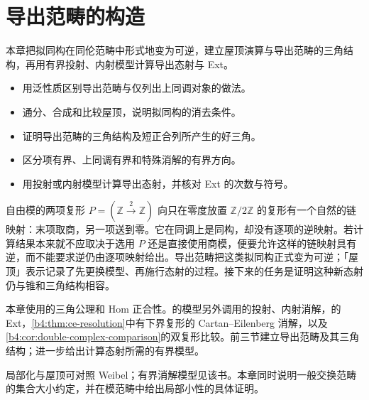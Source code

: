 
\chapter{导出范畴的构造}
\label{b4:ch:17}

\begin{chapterabstract}
	本章把拟同构在同伦范畴中形式地变为可逆，建立屋顶演算与导出范畴的三角结构，再用有界投射、内射模型计算导出态射与 Ext。
\end{chapterabstract}

\begin{learninggoals}
	\begin{itemize}
		\item 用泛性质区别导出范畴与仅列出上同调对象的做法。
		\item 通分、合成和比较屋顶，说明拟同构的消去条件。
		\item 证明导出范畴的三角结构及短正合列所产生的好三角。
		\item 区分项有界、上同调有界和特殊消解的有界方向。
		\item 用投射或内射模型计算导出态射，并核对 Ext 的次数与符号。
	\end{itemize}
\end{learninggoals}

自由模的两项复形 \(P=(\mathbb Z\xrightarrow{2}\mathbb Z)\) 向只在零度放置 \(\mathbb Z/2\mathbb Z\) 的复形有一个自然的链映射：末项取商，另一项送到零。它在同调上是同构，却没有逐项的逆映射。若计算结果本来就不应取决于选用 \(P\) 还是直接使用商模，便要允许这样的链映射具有逆，而不能要求逆仍由逐项映射给出。导出范畴把这类拟同构正式变为可逆；「屋顶」表示记录了先更换模型、再施行态射的过程。接下来的任务是证明这种新态射仍与锥和三角结构相容。

\ProseParagraphBreak
本章使用的三角公理和 Hom 正合性。的模型另外调用的投射、内射消解，的 Ext，\cref{b4:thm:ce-resolution}中有下界复形的 Cartan--Eilenberg 消解，以及\cref{b4:cor:double-complex-comparison}的双复形比较。前三节建立导出范畴及其三角结构；进一步给出计算态射所需的有界模型。

\ProseParagraphBreak
局部化与屋顶可对照 Weibel\cite[Section 10.3; Proposition 10.4.1]{Weibel1994HomologicalAlgebra}；有界消解模型见该书\cite[Corollary 10.4.7; Theorem 10.4.8]{Weibel1994HomologicalAlgebra}。本章同时说明一般交换范畴的集合大小约定，并在模范畴中给出局部小性的具体证明。

